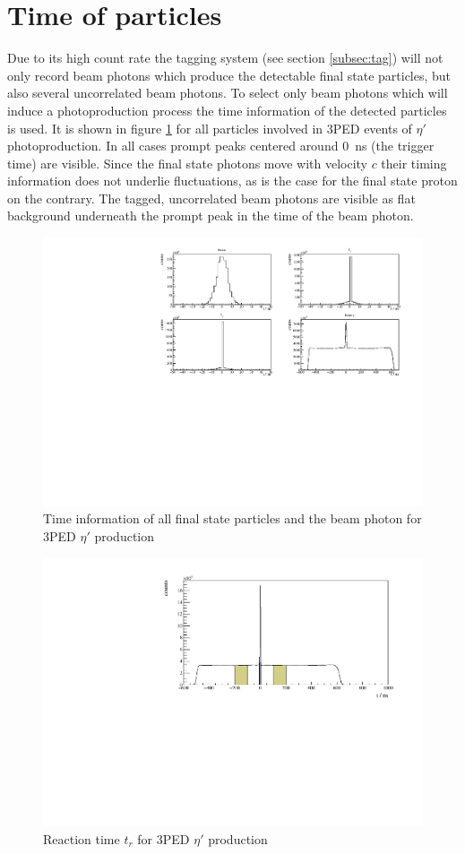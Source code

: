 \section{Time of particles}
Due to its high count rate the tagging system (see section \ref{subsec:tag}) will not only record beam photons which produce the detectable final state particles, but also several uncorrelated beam photons. To select only beam photons which will induce a photoproduction process the time information of the detected particles is used. It is shown in figure \ref{fig:time} for all particles involved in 3PED events of $\eta'$ photoproduction. In all cases prompt peaks centered around \SI{0}{\nano\s} (the trigger time) are visible. Since the final state photons move with velocity $c$ their timing information does not underlie fluctuations, as is the case for the final state proton on the contrary. The tagged, uncorrelated beam photons are visible as flat background underneath the prompt peak in the time of the beam photon.

\begin{figure}[htbp]
	\centering
	\includegraphics[width=\linewidth]{../figs/hydrogen/time/times.pdf}
	\caption{Time information of all final state particles and the beam photon for 3PED $\eta'$ production}
	\label{fig:time}
\end{figure} 

\begin{figure}[htbp]
	\centering
	\includegraphics[width=\linewidth]{../figs/hydrogen/time/reaction_time.pdf}
	\caption{Reaction time $t_r$ for 3PED $\eta'$ production}
	\label{fig:time_r}
\end{figure} 